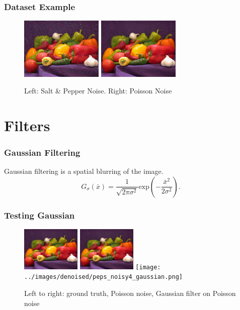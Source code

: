 \documentclass{beamer}
\begin{document}
%
\begin{frame}
  \frametitle{Dataset Example}

  \begin{figure}
    \centering
    \includegraphics[width =
    0.35\textwidth]{../images/peps_noisy1.png}
    \includegraphics[width =
    0.35\textwidth]{../images/peps_noisy4.png}
    \caption{Left: Salt \& Pepper Noise. Right: Poisson Noise}
  \end{figure}
  
  
\end{frame}
%
\section{Filters}
%
\begin{frame}
  \frametitle{Gaussian Filtering}
  Gaussian filtering is a spatial blurring of the image.
  \[G_{\sigma}(\bar{x}) = \frac{1}{\sqrt{2 \pi \sigma^2}} \text{exp} \left(-
      \frac{\bar{x}^2}{2 \sigma^2}\right). \]
\end{frame}
%
\begin{frame}
  \frametitle{Testing Gaussian}
  \begin{figure}
    \centering
  \includegraphics[width =
    0.25\textwidth]{../images/peps_truth.png}
    \includegraphics[width =
    0.25\textwidth]{../images/peps_noisy4.png}
    \texttt{[image: ../images/denoised/peps\_noisy4\_gaussian.png]}
    \caption{Left to right: ground truth, Poisson noise, Gaussian
      filter on Poisson noise }
  \end{figure}
\end{frame}
\end{document}
